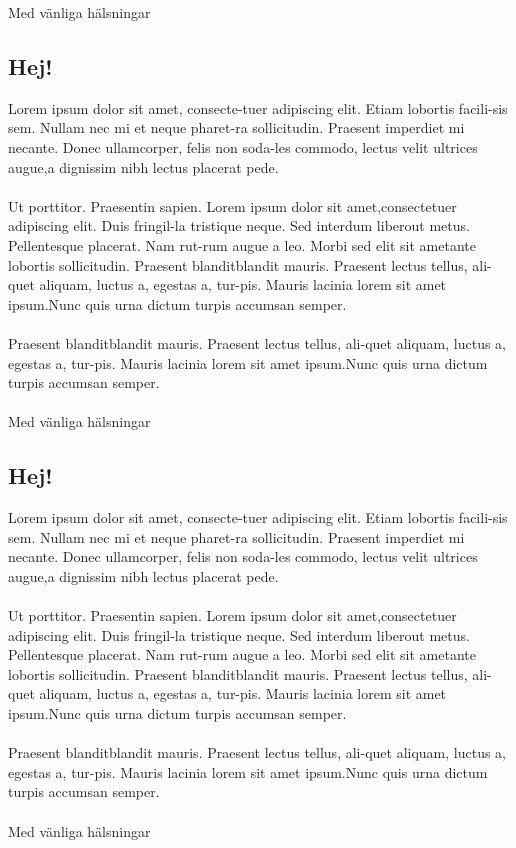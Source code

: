\documentclass{dsekddu}
\begin{document}
\begin{multicols*}{2}
Med vänliga hälsningar



\subsection{Hej!}
Lorem ipsum dolor sit amet, consecte-tuer adipiscing elit. Etiam lobortis facili-sis sem. Nullam nec mi et neque pharet-ra sollicitudin. Praesent imperdiet mi necante. Donec ullamcorper, felis non soda-les commodo, lectus velit ultrices augue,a dignissim nibh lectus placerat pede.
\\
\\
Ut porttitor. Praesentin sapien. Lorem ipsum dolor sit amet,consectetuer adipiscing elit. Duis fringil-la tristique neque. Sed interdum liberout metus. Pellentesque placerat. Nam rut-rum augue a leo. Morbi sed elit sit ametante lobortis sollicitudin. Praesent blanditblandit mauris. Praesent lectus tellus, ali-quet aliquam, luctus a, egestas a, tur-pis. Mauris lacinia lorem sit amet ipsum.Nunc quis urna dictum turpis accumsan semper.
 \\
 \\
Praesent blanditblandit mauris. Praesent lectus tellus, ali-quet aliquam, luctus a, egestas a, tur-pis. Mauris lacinia lorem sit amet ipsum.Nunc quis urna dictum turpis accumsan semper.
\\
\\
Med vänliga hälsningar



\subsection{Hej!}
Lorem ipsum dolor sit amet, consecte-tuer adipiscing elit. Etiam lobortis facili-sis sem. Nullam nec mi et neque pharet-ra sollicitudin. Praesent imperdiet mi necante. Donec ullamcorper, felis non soda-les commodo, lectus velit ultrices augue,a dignissim nibh lectus placerat pede.
\\
\\
Ut porttitor. Praesentin sapien. Lorem ipsum dolor sit amet,consectetuer adipiscing elit. Duis fringil-la tristique neque. Sed interdum liberout metus. Pellentesque placerat. Nam rut-rum augue a leo. Morbi sed elit sit ametante lobortis sollicitudin. Praesent blanditblandit mauris. Praesent lectus tellus, ali-quet aliquam, luctus a, egestas a, tur-pis. Mauris lacinia lorem sit amet ipsum.Nunc quis urna dictum turpis accumsan semper.
 \\
 \\
Praesent blanditblandit mauris. Praesent lectus tellus, ali-quet aliquam, luctus a, egestas a, tur-pis. Mauris lacinia lorem sit amet ipsum.Nunc quis urna dictum turpis accumsan semper.
\\
\\
Med vänliga hälsningar

\end{multicols*}
\setddufooter
\end{document}

